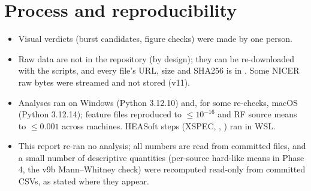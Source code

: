 \section{Process and reproducibility}
\begin{itemize}
\item Visual verdicts (burst candidates, figure checks) were made by one person.
\item Raw data are not in the repository (by design); they can be re-downloaded with the scripts, and every file's URL, size and SHA256 is in
. Some NICER raw bytes were streamed and not stored (v11).
\item Analyses ran on Windows (Python 3.12.10) and, for some re-checks, macOS (Python 3.12.14); feature files reproduced to $\le10^{-16}$ and RF source
means to $\le0.001$ across machines. HEASoft steps (XSPEC, , ) ran in WSL.
\item This report re-ran no analysis; all numbers are read from committed files, and a small number of descriptive quantities (per-source
hard-like means in Phase 4, the v9b Mann--Whitney check) were recomputed read-only from committed CSVs, as stated where they appear.
\end{itemize}
